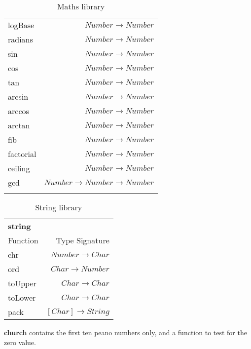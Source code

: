 \begin{longtable}{l r}
        logBase & $Number \rightarrow Number$ \\
        radians & $Number \rightarrow Number$ \\
        sin & $Number \rightarrow Number$ \\
        cos & $Number \rightarrow Number$ \\
        tan & $Number \rightarrow Number$ \\
        arcsin & $Number \rightarrow Number$ \\
        arccos & $Number \rightarrow Number$ \\
        arctan & $Number \rightarrow Number$ \\
        fib & $Number \rightarrow Number$ \\
        factorial & $Number \rightarrow Number$ \\
        ceiling & $Number \rightarrow Number$ \\
        gcd & $Number \rightarrow Number \rightarrow Number$ \\
    \caption{Maths library}
\label{table:maths}
\end{longtable}

\begin{table}[H]
    \begin{tabular}{l r}
    \rowcolor{light-gray}
        \textbf{string} & \\
        Function & Type Signature \\
        \hline
        chr & $Number \rightarrow Char$ \\
        ord & $Char \rightarrow Number$ \\
        toUpper & $Char \rightarrow Char$ \\
        toLower & $Char \rightarrow Char$ \\
        pack & $[Char] \rightarrow String$ \\
    \end{tabular}
    \caption{String library}
\label{table:string}
\end{table}
\textbf{church} contains the first ten peano numbers only, and a function to test for the zero
value.
